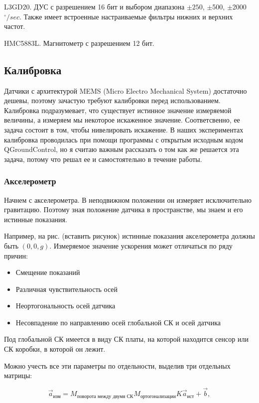 \documentclass[12pt,a4paper]{article}
\begin{document}
L3GD20. ДУС с разрешением 16 бит и выбором диапазона $\pm250$, $\pm$500, $\pm$2000 $^\circ /sec$. Также имеет встроенные настраиваемые фильтры нижних и верхних частот.

HMC5883L. Магнитометр с разрешением 12 бит.

\subsection{Калибровка}

Датчики с архитектурой MEMS (Micro Electro Mechanical System) достаточно дешевы, поэтому зачастую требуют калибровки перед использованием. Калибровка подразумевает, что существует истинное значение измеряемой величины, а измеряем мы некоторое искаженное значение. Соответсвенно, ее задача состоит в том, чтобы нивелировать искажение. В наших экспериментах калибровка проводилась при помощи программы с открытым исходным кодом QGroundControl, но я считаю важным рассказать о том как же решается эта задача, потому что решал ее и самостоятельно в течение работы.

\subsubsection{Акселерометр}

Начнем с акселерометра. В неподвижном положении он измеряет исключительно гравитацию. Поэтому зная положение датчика в пространстве, мы знаем и его истинные показания.

Например, на рис. (вставить рисунок) истинные показания акселерометра должны быть $(0, 0, g)$. Измеряемое значение ускорения может отличаться по ряду причин:

\begin{itemize}
	\item Смещение показаний
	\item Различная чувствительность осей
	\item Неортогональность осей датчика
	\item Несовпадение по направлению осей глобальной СК и осей датчика
\end{itemize}

Под глобальной СК имеется в виду СК платы, на которой находится сенсор или СК коробки, в которой он лежит.

Можно учесть все эти параметры по отдельности, выделив три отдельных матрицы:

$$ \vec{a}_{\text{изм}} = M_{\text{поворота между двумя СК}} M_{\text{ортогонализации}} K \vec{a}_{\text{ист}} + \vec{b},$$
\end{document}
